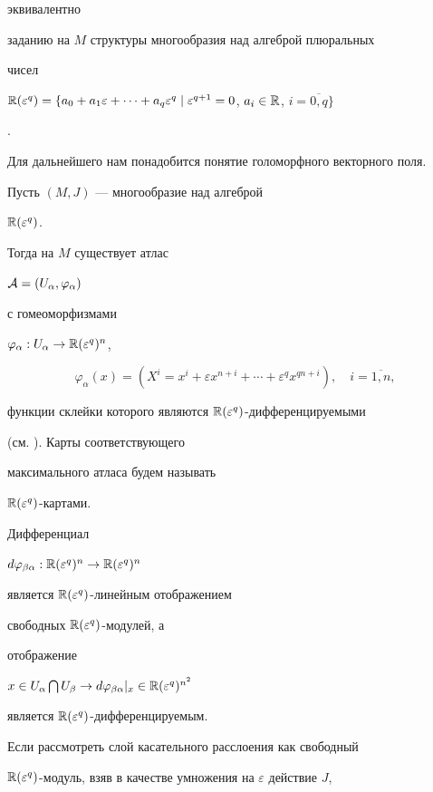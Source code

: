 эквивалентно


заданию на $M$ структуры многообразия над алгеброй плюральных


чисел


$\re = \{a_{0}+a_{1}\varepsilon +\dotsb + a_{q} \varepsilon^q \mid \varepsilon


^{q+1}=0$, $ a_{i}\in {\Bbb R}$, $ i=\overline{0,q}\}$


\cite{Vish}.





Для дальнейшего нам понадобится понятие  голоморфного векторного поля.


Пусть $(M,J)$ --- многообразие над алгеброй


$\Bbb R(\varepsilon^q)$.


Тогда на $M$ существует атлас


${\cal A }= ( U_{\alpha}, \varphi_{\alpha})$


с гомеоморфизмами


$\varphi _{\alpha} : U_{\alpha} \to \Bbb R(\varepsilon^q)^n$,


$$


\varphi _{\alpha}(x)= (X^{i}= x^{i} + \varepsilon x^{n+i} +


\dotsb + \varepsilon   ^{q} x^{qn+i}),\quad i = \overline{1,n},


$$


функции склейки которого являются  $\Bbb R(\varepsilon^q)$-дифференцируемыми


(см. \cite{Vish}). Карты соответствующего


максимального атласа будем называть


$\Bbb R(\varepsilon^q)$-картами.


Дифференциал


$d\varphi _{\beta \alpha} :\Bbb R(\varepsilon^q)^n \to \Bbb R(\varepsilon^q)^n $


является $\Bbb R(\varepsilon^q)$-линейным отображением


свободных $\Bbb R(\varepsilon^q)$-модулей, а


отображение


$x\in U_{\alpha} \bigcap U_{\beta} \to


d\varphi _{\beta \alpha}\vert_{x} \in


{\Bbb R}(\varepsilon^{q})^{n^{2}}$


является $\Bbb R(\varepsilon^q)$-дифференцируемым.





Если рассмотреть слой касательного расслоения как свободный


$\Bbb R(\varepsilon^q)$-модуль, взяв в качестве умножения на $\varepsilon$ действие $J$,


